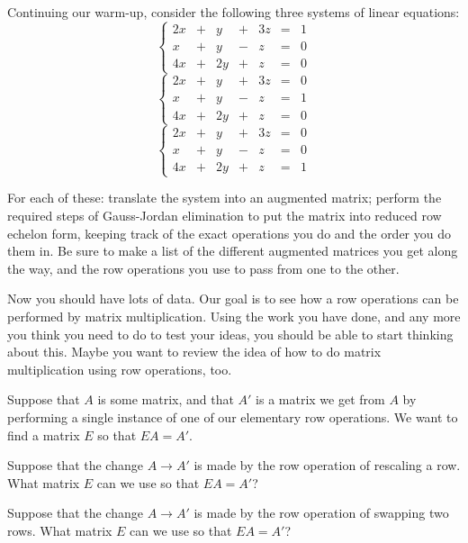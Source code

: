 \documentclass[elementsmain.tex]{subfiles}
\begin{document}
\begin{exercise}
Continuing our warm-up, consider the following three systems of linear equations:
\[\tag{C}
\left\{ \begin{array}{rrrrrrr}
2x & + & y & + & 3z & = & 1 \\
x & + & y & - & z & = & 0 \\
4x & + & 2y & + & z & = & 0
\end{array}\right.
\]
\[\tag{D}
\left\{ \begin{array}{rrrrrrr}
2x & + & y & + & 3z & = & 0 \\
x & + & y & - & z & = & 1 \\
4x & + & 2y & + & z & = & 0
\end{array}\right.
\]
\[\tag{E}
\left\{ \begin{array}{rrrrrrr}
2x & + & y & + & 3z & = & 0 \\
x & + & y & - & z & = & 0 \\
4x & + & 2y & + & z & = & 1
\end{array}\right.
\]

For each of these: translate the system into an augmented matrix; perform the required steps of Gauss-Jordan elimination to put the matrix into reduced row echelon form, keeping track of the exact operations you do and the order you do them in. Be sure to make a list of the different augmented matrices you get along the way, and the row operations you use to pass from one to the other.
\end{exercise}

Now you should have lots of data. Our goal is to see how a row operations can be performed by matrix multiplication. Using the work you have done, and any more you think you need to do to test your ideas, you should be able to start thinking about this. Maybe you want to review the idea of how to do matrix multiplication using row operations, too.

Suppose that $A$ is some matrix, and that $A'$ is a matrix we get from $A$ by performing a single instance of one of our elementary row operations. We want to find a matrix $E$ so that $EA = A'$.

\begin{exercise} Suppose that the change $A\rightarrow A'$ is made by the row operation of rescaling a row. What matrix $E$ can we use so that $EA = A'$?
\end{exercise} 

\begin{exercise} Suppose that the change $A\rightarrow A'$ is made by the row operation of swapping two rows. What matrix $E$ can we use so that $EA = A'$?
\end{exercise} 
\end{document}
